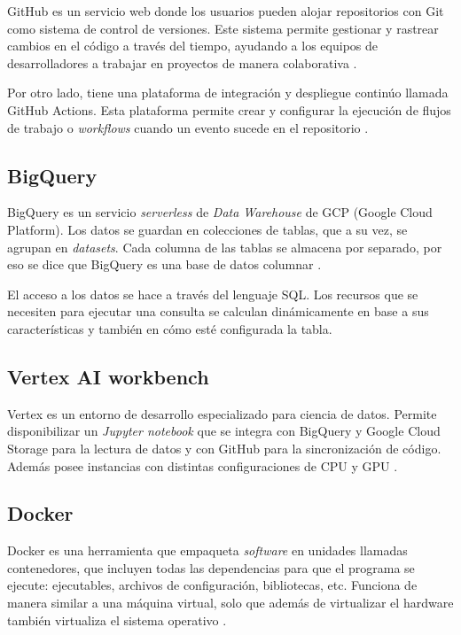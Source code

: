 GitHub es un servicio web donde los usuarios pueden alojar repositorios con Git como sistema de control de versiones. Este sistema permite gestionar y rastrear cambios en el código a través del tiempo, ayudando a los equipos de desarrolladores a trabajar en proyectos de manera colaborativa \citep{WEBSITE:33}.

Por otro lado, tiene una plataforma de integración y despliegue continúo llamada GitHub Actions. Esta plataforma permite crear y configurar la ejecución de flujos de trabajo o \textit{workflows} cuando un evento sucede en el repositorio \citep{WEBSITE:37}.

\subsection{BigQuery}
\label{cap2-bq}

BigQuery es un servicio \textit{serverless} de \textit{Data Warehouse} de GCP (Google Cloud Platform). Los datos se guardan en colecciones de tablas, que a su vez, se agrupan en \textit{datasets}. Cada columna de las tablas se almacena por separado, por eso se dice que BigQuery es una base de datos columnar \citep{WEBSITE:30}.

El acceso a los datos se hace a través del lenguaje SQL. Los recursos que se necesiten para ejecutar una consulta se calculan dinámicamente en base a sus características y también en cómo esté configurada la tabla.

\subsection{Vertex AI workbench}

Vertex es un entorno de desarrollo especializado para ciencia de datos. Permite disponibilizar un \textit{Jupyter notebook} que se integra con BigQuery y Google Cloud Storage para la lectura de datos y con GitHub para la sincronización de código. Además posee instancias con distintas configuraciones de CPU y GPU \citep{WEBSITE:34}. 

\subsection{Docker}

Docker es una herramienta que empaqueta \textit{software} en unidades llamadas contenedores, que incluyen todas las dependencias para que el programa se ejecute: ejecutables, archivos de configuración, bibliotecas, etc. Funciona de manera similar a una máquina virtual, solo que además de virtualizar el hardware también virtualiza el sistema operativo \citep{WEBSITE:35}.

